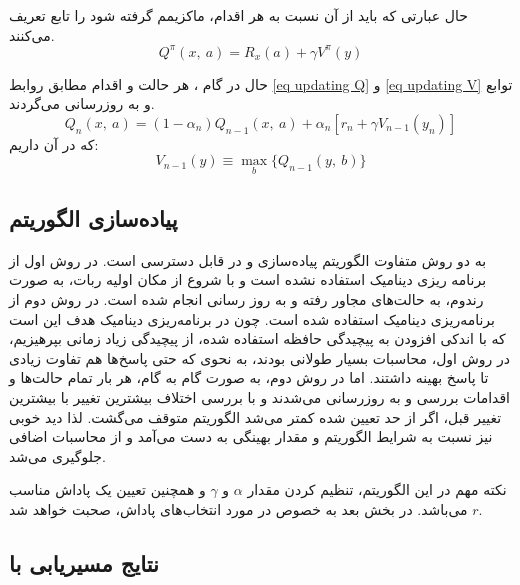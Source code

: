 حال عبارتی که باید از آن نسبت به هر اقدام، ماکزیمم گرفته شود را تابع  تعریف می‌کنند.
\begin{equation}
Q^\pi (x,~a) = R_x(a) + \gamma V^\pi (y)
\end{equation}

حال در گام ، هر حالت و اقدام مطابق روابط \ref{eq updating Q} و \ref{eq updating V} توابع  و  به روزرسانی می‌گردند.
\begin{equation}\label{eq updating Q}
Q_n(x,~a) = (1-\alpha_n)Q_{n-1}(x,~a) + \alpha_n[r_n + \gamma V_{n-1}(y_n)]
\end{equation}
که در آن داریم:
\begin{equation}\label{eq updating V}
V_{n-1}(y) \equiv \max_{b}\{Q_{n-1}(y,~b)\}
\end{equation}

\subsection{پیاده‌سازی الگوریتم }
به دو روش متفاوت الگوریتم  پیاده‌سازی و در \cite{roozbeh2020} قابل دسترسی است. در روش اول از برنامه ریزی دینامیک استفاده نشده است و با شروع از مکان اولیه ربات، به صورت رندوم، به حالت‌های مجاور رفته و به روز رسانی انجام شده است. در روش دوم از برنامه‌ریزی دینامیک استفاده شده است. چون در برنامه‌ریزی دینامیک هدف این است که با اندکی افزودن به پیچیدگی حافظه استفاده شده، از پیچیدگی زیاد زمانی بپرهیزیم، در روش اول، محاسبات بسیار طولانی بودند، به نحوی که حتی پاسخ‌ها هم تفاوت زیادی تا پاسخ بهینه داشتند. اما در روش دوم، به صورت گام به گام، هر بار تمام حالت‌ها و اقدامات بررسی و به روزرسانی می‌شدند و با بررسی اختلاف بیشترین تغییر با بیشترین تغییر قبل، اگر از حد تعیین شده کمتر می‌شد الگوریتم متوقف می‌گشت. لذا دید خوبی نیز نسبت به شرایط الگوریتم و مقدار بهینگی به دست می‌آمد و از محاسبات اضافی جلوگیری می‌شد.

نکته مهم در این الگوریتم، تنظیم کردن مقدار $\alpha$ و $\gamma$ و همچنین تعیین یک پاداش مناسب $r$ می‌باشد. در بخش بعد به خصوص در مورد انتخاب‌های پاداش، صحبت خواهد شد.

\subsection{نتایج مسیریابی با }




















